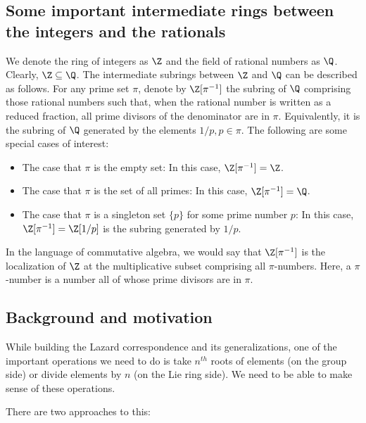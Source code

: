 \documentclass{ucetd}
\begin{document}
\subsection{Some important intermediate rings between the integers and the rationals}

We denote the ring of integers as $\Z$ and the field of rational
numbers as $\Q$. Clearly, $\Z \subseteq \Q$. The intermediate subrings
between $\Z$ and $\Q$ can be described as follows. For any prime set
$\pi$, denote by $\Z[\pi^{-1}]$ the subring of $\Q$ comprising those
rational numbers such that, when the rational number is written as a
reduced fraction, all prime divisors of the denominator are in
$\pi$. Equivalently, it is the subring of $\Q$ generated by the
elements $1/p, p \in \pi$. The following are some special cases of
interest:

\begin{itemize}
\item The case that $\pi$ is the empty set: In this case,
  $\Z[\pi^{-1}] = \Z$.
\item The case that $\pi$ is the set of all primes: In this case,
  $\Z[\pi^{-1}] = \Q$.
\item The case that $\pi$ is a singleton set $\{ p \}$ for some prime
  number $p$: In this case, $\Z[\pi^{-1}] = \Z[1/p]$ is the subring
  generated by $1/p$.
\end{itemize}

In the language of commutative algebra, we would say that
$\Z[\pi^{-1}]$ is the localization of $\Z$ at the multiplicative
subset comprising all $\pi$-numbers. Here, a $\pi$-number is a number
all of whose prime divisors are in $\pi$.

\subsection{Background and motivation}

While building the Lazard correspondence and its generalizations, one
of the important operations we need to do is take $n^{th}$ roots of
elements (on the group side) or divide elements by $n$ (on the Lie
ring side). We need to be able to make sense of these operations.

There are two approaches to this:
\end{document}
